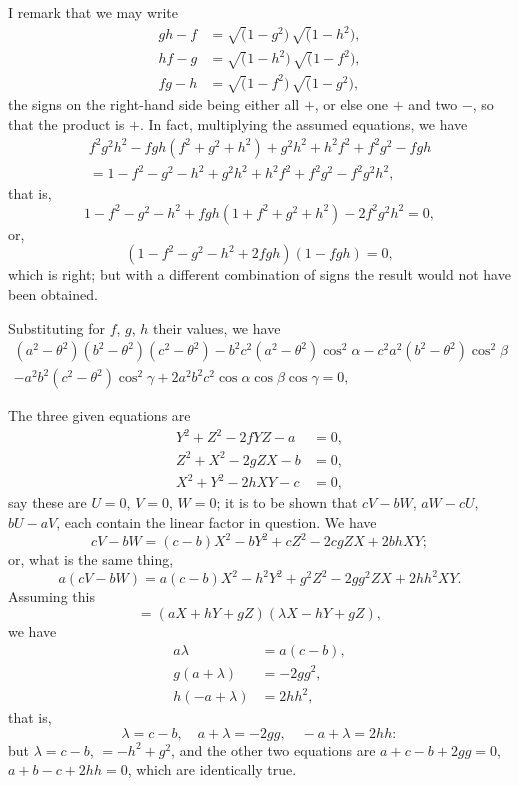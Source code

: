 \documentclass[11pt,a4paper]{book}
\begin{document}
I remark that we may write
\begin{align*}
gh - f &= \surd(1-g^2)\,\surd(1-h^2),\\
hf - g &= \surd(1-h^2)\,\surd(1-f^2),\\
fg - h &= \surd(1-f^2)\,\surd(1-g^2),
\end{align*}
the signs on the right-hand side being either all $+$, or else one $+$ and two $-$, so that the product is $+$. In fact, multiplying the assumed equations, we have
\begin{multline}
f^2g^2h^2 - fgh(f^2+g^2+h^2) + g^2h^2 + h^2f^2 + f^2g^2 - fgh\\
= 1 - f^2 - g^2 - h^2 + g^2h^2 + h^2f^2 + f^2g^2 - f^2g^2h^2,
\end{multline}
that is,
\[
1 - f^2 - g^2 - h^2 + fgh(1+f^2+g^2+h^2) - 2f^2g^2h^2 = 0,
\]
or,
\[
(1 - f^2 - g^2 - h^2 + 2fgh)(1 - fgh) = 0,
\]
which is right; but with a different combination of signs the result would not have been obtained.

Substituting for $f$, $g$, $h$ their values, we have
\begin{multline}
(a^2-\theta^2)(b^2-\theta^2)(c^2-\theta^2) - b^2c^2(a^2-\theta^2)\cos^2\alpha - c^2a^2(b^2-\theta^2)\cos^2\beta\\
- a^2b^2(c^2-\theta^2)\cos^2\gamma + 2a^2b^2c^2\cos\alpha\cos\beta\cos\gamma = 0,
\end{multline}

The three given equations are
\begin{align*}
Y^2 + Z^2 - 2fYZ - a &= 0,\\
Z^2 + X^2 - 2gZX - b &= 0,\\
X^2 + Y^2 - 2hXY - c &= 0,
\end{align*}
say these are $U = 0$, $V = 0$, $W = 0$; it is to be shown that $cV - bW$, $aW - cU$, $bU - aV$, each contain the linear factor in question. We have
\[
cV - bW = (c-b)X^2 - bY^2 + cZ^2 - 2cgZX + 2bhXY;
\]
or, what is the same thing,
\[
a(cV - bW) = a(c-b)X^2 - h^2Y^2 + g^2Z^2 - 2gg^2ZX + 2hh^2XY.
\]
Assuming this
\[
= (aX + hY + gZ)(\lambda X - hY + gZ),
\]
we have
\begin{align*}
a\lambda &= a(c-b),\\
g(a + \lambda) &= -2gg^2,\\
h(-a + \lambda) &= 2hh^2,
\end{align*}
that is,
\[
\lambda = c-b,\quad a+\lambda = -2gg,\quad -a+\lambda = 2hh:
\]
but $\lambda = c-b$, $= -h^2+g^2$, and the other two equations are $a+c-b+2gg = 0$, $a+b-c+2hh = 0$, which are identically true.
\end{document}
